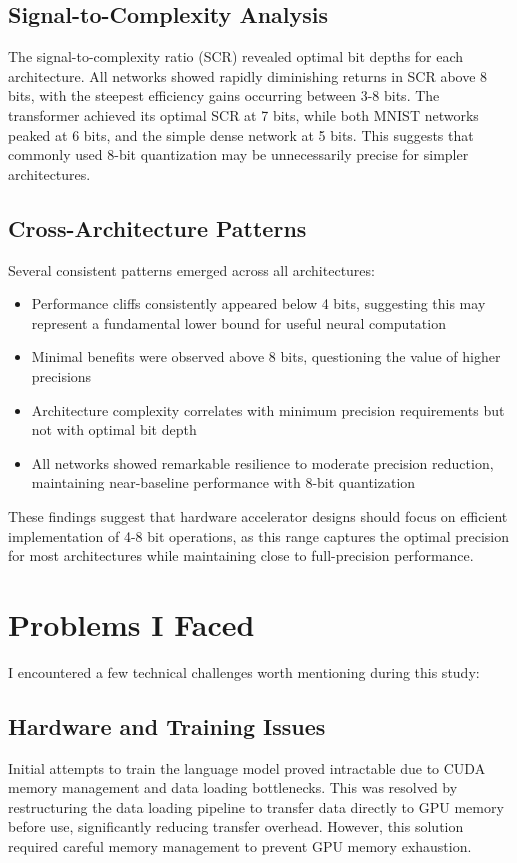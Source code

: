 \documentclass[twocolumn]{article}
\begin{document}
\subsection{Signal-to-Complexity Analysis}
The signal-to-complexity ratio (SCR) revealed optimal bit depths for each
architecture. All networks showed rapidly diminishing returns in SCR above 8
bits, with the steepest efficiency gains occurring between 3-8 bits. The
transformer achieved its optimal SCR at 7 bits, while both MNIST networks peaked
at 6 bits, and the simple dense network at 5 bits. This suggests that commonly
used 8-bit quantization may be unnecessarily precise for simpler architectures.

\subsection{Cross-Architecture Patterns}
Several consistent patterns emerged across all architectures:
\begin{itemize}
\item Performance cliffs consistently appeared below 4 bits, suggesting this may
represent a fundamental lower bound for useful neural computation
\item Minimal benefits were observed above 8 bits, questioning the value of
higher precisions
\item Architecture complexity correlates with minimum precision requirements but
not with optimal bit depth
\item All networks showed remarkable resilience to moderate precision reduction,
maintaining near-baseline performance with 8-bit quantization
\end{itemize}
These findings suggest that hardware accelerator designs should focus on
efficient implementation of 4-8 bit operations, as this range captures the
optimal precision for most architectures while maintaining close to
full-precision performance.

\printbibliography

\appendix
\section{Problems I Faced}
I encountered a few technical challenges worth mentioning during this study:

\subsection{Hardware and Training Issues}
Initial attempts to train the language model proved intractable due to CUDA
memory management and data loading bottlenecks. This was resolved by
restructuring the data loading pipeline to transfer data directly to GPU memory
before use, significantly reducing transfer overhead. However, this solution
required careful memory management to prevent GPU memory exhaustion.
\end{document}
